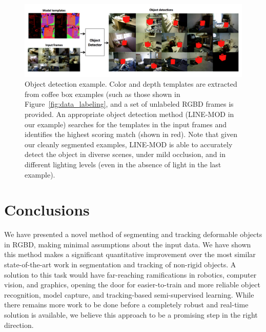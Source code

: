 \documentclass[graybox]{svmult}
\begin{document}
\begin{figure}
\centering
        \includegraphics[width=\linewidth]{img/object_recognition.png}
\caption{\small{Object detection example. Color and depth templates are extracted from coffee box examples (such as those shown in Figure~\ref{fig:data_labeling}, and a set of unlabeled RGBD frames is provided.  An appropriate object detection method (LINE-MOD in our example) searches for the templates in the input frames and identifies the highest scoring match (shown in red). Note that given our cleanly segmented examples, LINE-MOD is able to accurately detect the object in diverse scenes, under mild occlusion, and in different lighting levels (even in the absence of light in the last example).}}
\label{fig:object_rec}
\end{figure}

\section{Conclusions}

We have presented a novel method of segmenting and tracking deformable objects in RGBD, making minimal assumptions about the input data.  We have shown this method makes a significant quantitative improvement over the most similar state-of-the-art work in segmentation and tracking of non-rigid objects.  A solution to this task would have far-reaching ramifications in robotics, computer vision, and graphics, opening the door for easier-to-train and more reliable object recognition, model capture, and tracking-based semi-supervised learning.  While there remains more work to be done before a completely robust and real-time solution is available, we believe this approach to be a promising step in the right direction.

\pagebreak

\small{


}
\end{document}
